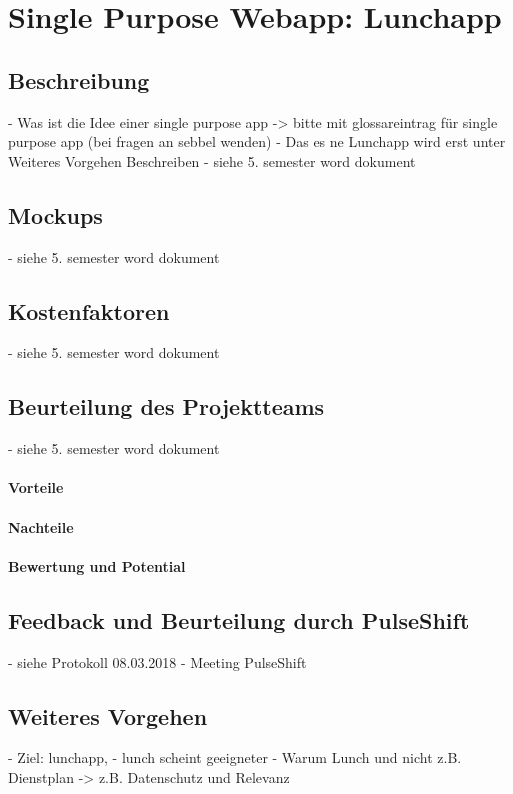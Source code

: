\section{Single Purpose Webapp: Lunchapp}
\label{section:lunchapp}

\subsection{Beschreibung}

- Was ist die Idee einer single purpose app -> bitte mit glossareintrag für single purpose app (bei fragen an sebbel wenden)
- Das es ne Lunchapp wird erst unter Weiteres Vorgehen Beschreiben
- siehe 5. semester word dokument

\subsection{Mockups}

- siehe 5. semester word dokument

\subsection{Kostenfaktoren}

- siehe 5. semester word dokument

\subsection{Beurteilung des Projektteams}

- siehe 5. semester word dokument

\paragraph{Vorteile}

\paragraph{Nachteile}

\paragraph{Bewertung und Potential}

\subsection{Feedback und Beurteilung durch PulseShift}

- siehe Protokoll 08.03.2018 - Meeting PulseShift


\subsection{Weiteres Vorgehen}

- Ziel: lunchapp, 
- lunch scheint geeigneter
- Warum Lunch und nicht z.B. Dienstplan -> z.B. Datenschutz und Relevanz
